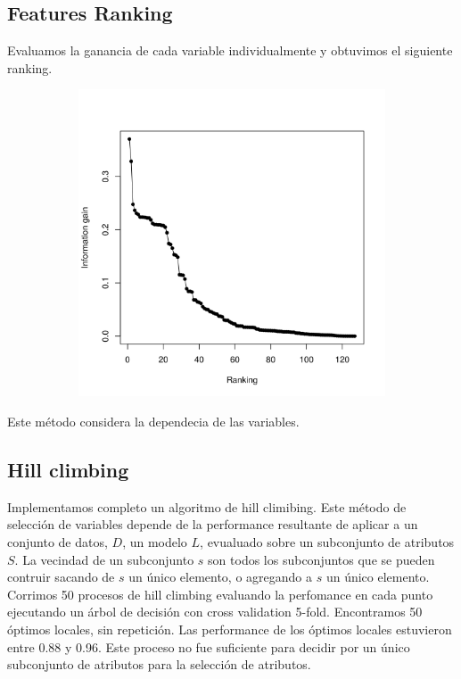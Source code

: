 \documentclass[a4paper,10pt]{article}
\begin{document}
\subsection{Features Ranking}

Evaluamos la ganancia de cada variable individualmente y obtuvimos el siguiente ranking. 

  \begin{figure}[H]
    \centering
    \begin{subfigure}[b]{0.4\textwidth}
      \includegraphics[width=\textwidth]{../imagenes/features_ranking}
      \caption{}
    \end{subfigure}
    \label{fig:features_ranking}
  \end{figure}

Este m\'etodo considera la dependecia de las variables. 

\subsection{Hill climbing}

Implementamos completo un algoritmo de hill climibing. Este m\'etodo de selecci\'on de variables depende de la performance resultante de aplicar a un conjunto de datos, $D$, un modelo $L$, evualuado sobre un subconjunto de atributos $S$. La vecindad de un subconjunto $s$ son todos los subconjuntos que se pueden contruir sacando de $s$ un \'unico elemento, o agregando a $s$ un \'unico elemento. Corrimos 50 procesos de hill climbing evaluando la perfomance en cada punto ejecutando un \'arbol de decisi\'on con cross validation 5-fold. Encontramos 50 \'optimos locales, sin repetici\'on. Las performance de los \'optimos locales estuvieron entre 0.88 y 0.96. Este proceso no fue suficiente para decidir por un \'unico subconjunto de atributos para la selecci\'on de atributos. 
\end{document}
